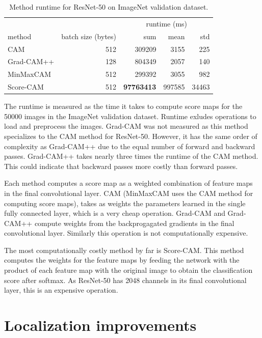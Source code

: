 \begin{table}[ht]
\centering
\begin{tabular}{lrrrr}
\toprule
\multicolumn{2}{c}{} & \multicolumn{3}{c}{runtime (ms)} \\
method & batch size (bytes) & sum & mean & std \\
\cmidrule(lr){1-2} \cmidrule(lr){3-5}
CAM & 512 & 309209 & 3155 & 225 \\
Grad-CAM++ & 128 & 804349 & 2057 & 140 \\
MinMaxCAM & 512 & 299392 & 3055 & 982 \\
Score-CAM & 512 & \bfseries 97763413 & 997585 & 34463\\
\bottomrule
\end{tabular}
\caption[Method runtime for ResNet-50 on ImageNet validation dataset]{Method runtime for ResNet-50 on ImageNet validation dataset.}
\label{tab:runtime_resnet50_imagenet}
\end{table}

The runtime is measured as the time it takes to compute score maps for the 50000 images in the ImageNet validation dataset. Runtime exludes operations to load and preprocess the images. Grad-CAM was not measured as this method specializes to the CAM method for ResNet-50. However, it has the same order of complexity as Grad-CAM++ due to the equal number of forward and backward passes. Grad-CAM++ takes nearly three times the runtime of the CAM method. This could indicate that backward passes more costly than forward passes.

Each method computes a score map as a weighted combination of feature maps in the final convolutional layer. CAM (MinMaxCAM uses the CAM method for computing score maps), takes as weights the parameters learned in the single fully connected layer, which is a very cheap operation. Grad-CAM and Grad-CAM++ compute weights from the backprogagated gradients in the final convolutional layer. Similarly this operation is not computationally expensive.

The most computationally costly method by far is Score-CAM. This method computes the weights for the feature maps by feeding the network with the product of each feature map with the original image to obtain the classification score after softmax. As ResNet-50 has 2048 channels in its final convolutional layer, this is an expensive operation.

\section{Localization improvements}

